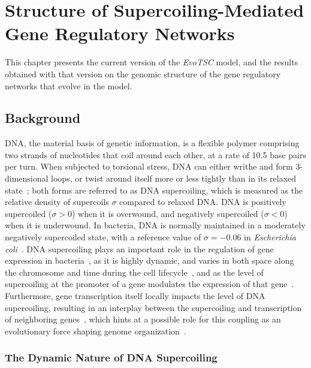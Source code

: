 \chapter{Structure of Supercoiling-Mediated Gene Regulatory Networks}
\label{chap:ploscb}

This chapter presents the current version of the \emph{EvoTSC} model, and the results obtained with that version on the genomic structure of the gene regulatory networks that evolve in the model.


\section{Background}

DNA, the material basis of genetic information, is a flexible polymer comprising two strands of nucleotides that coil around each other, at a rate of 10.5 base pairs per turn.
When subjected to torsional stress, DNA can either writhe and form 3-dimensional loops, or twist around itself more or less tightly than in its relaxed state~\citep{travers2005}; both forms are referred to as DNA supercoiling, which is measured as the relative density of supercoils $\sigma$ compared to relaxed DNA.
DNA is positively supercoiled ($\sigma > 0$) when it is overwound, and negatively supercoiled ($\sigma < 0$) when it is underwound.
In bacteria, DNA is normally maintained in a moderately negatively supercoiled state, with a reference value of $\sigma=-0.06$ in \emph{Escherichia coli}~\citep{travers2005}.
DNA supercoiling plays an important role in the regulation of gene expression in bacteria~\citep{martisb.2019}, as it is highly dynamic, and varies in both space along the chromosome and time during the cell lifecycle~\citep{krogh2018}, and as the level of supercoiling at the promoter of a gene modulates the expression of that gene~\citep{forquet2021}.
Furthermore, gene transcription itself locally impacts the level of DNA supercoiling, resulting in an interplay between the supercoiling and transcription of neighboring genes~\citep{meyer2014}, which hints at a possible role for this coupling as an evolutionary force shaping genome organization~\citep{junier2016}.

\subsection{The Dynamic Nature of DNA Supercoiling}

